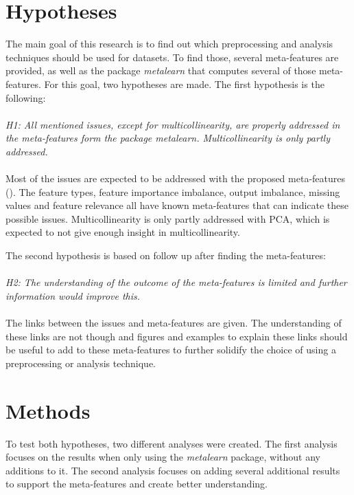 \documentclass[10pt,a4paper]{report}
\begin{document}
	\section{Hypotheses}
	\label{DEsec:Hypothesis}
	
	The main goal of this research is to find out which preprocessing and analysis techniques should be used for datasets. To find those, several meta-features are provided, as well as the package \textit{metalearn} that computes several of those meta-features. For this goal, two hypotheses are made. 
	The first hypothesis is the following: \\
	\\
	
	\textit{H1: All mentioned issues, except for multicollinearity, are properly addressed in the meta-features form the package \textit{metalearn}. Multicollinearity is only partly addressed.} \\
	\\
	Most of the issues are expected to be addressed with the proposed meta-features (). The feature types, feature importance imbalance, output imbalance, missing values and feature relevance all have known meta-features that can indicate these possible issues. Multicollinearity is only partly addressed with PCA, which is expected to not give enough insight in multicollinearity.
	
	The second hypothesis is based on follow up after finding the meta-features: \\
	\\
	\textit{H2: The understanding of the outcome of the meta-features is limited and further information would improve this.} \\
	\\
	The links between the issues and meta-features are given. The understanding of these links are not though and figures and examples to explain these links should be useful to add to these meta-features to further solidify the choice of using a preprocessing or analysis technique.
	
	\section{Methods}
	\label{DEsec:Methods}
	
	To test both hypotheses, two different analyses were created. The first analysis focuses on the results when only using the \textit{metalearn} package, without any additions to it. The second analysis focuses on adding several additional results to support the meta-features and create better understanding.
	
\end{document}
